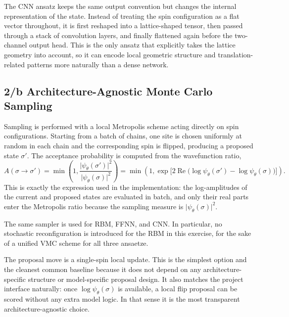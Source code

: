 \documentclass[11pt,a4paper]{article}
\begin{document}
The CNN ansatz keeps the same output convention but changes the internal representation of the state. Instead of treating the spin configuration as a flat vector throughout, it is first reshaped into a lattice-shaped tensor, then passed through a stack of convolution layers, and finally flattened again before the two-channel output head. This is the only ansatz that explicitly takes the lattice geometry into account, so it can encode local geometric structure and translation-related patterns more naturally than a dense network.

\subsection*{2/b Architecture-Agnostic Monte Carlo Sampling}

Sampling is performed with a local Metropolis scheme acting directly on spin configurations. Starting from a batch of chains, one site is chosen uniformly at random in each chain and the corresponding spin is flipped, producing a proposed state $\sigma'$. The acceptance probability is computed from the wavefunction ratio,
\begin{equation}
    A(\sigma \rightarrow \sigma')
    =
    \min\!\left(
        1,
        \frac{\lvert \psi_\theta(\sigma') \rvert^2}{\lvert \psi_\theta(\sigma) \rvert^2}
    \right)
    =
    \min\!\left(
        1,
        \exp \bigl[ 2 \operatorname{Re} \bigl( \log \psi_\theta(\sigma') - \log \psi_\theta(\sigma) \bigr) \bigr]
    \right).
\end{equation}
This is exactly the expression used in the implementation: the log-amplitudes of the current and proposed states are evaluated in batch, and only their real parts enter the Metropolis ratio because the sampling measure is $\lvert \psi_\theta(\sigma) \rvert^2$.

The same sampler is used for RBM, FFNN, and CNN. In particular, no stochastic reconfiguration is introduced for the RBM in this exercise, for the sake of a unified VMC scheme for all three ansaetze.

The proposal move is a single-spin local update. This is the simplest option and the cleanest common baseline because it does not depend on any architecture-specific structure or model-specific proposal design. It also matches the project interface naturally: once $\log \psi_\theta(\sigma)$ is available, a local flip proposal can be scored without any extra model logic. In that sense it is the most transparent architecture-agnostic choice.
\end{document}
